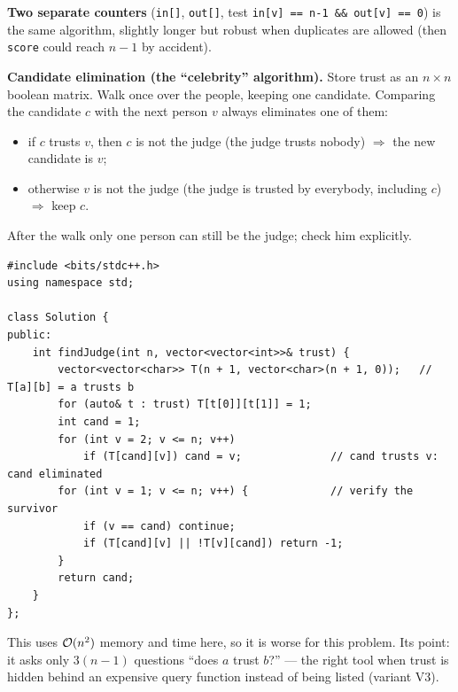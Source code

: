 \begin{alternativebox}
\textbf{Two separate counters} (\texttt{in[]}, \texttt{out[]}, test \texttt{in[v] == n-1 \&\& out[v] == 0}) is the same algorithm, slightly longer but robust when duplicates are allowed (then \texttt{score} could reach $n-1$ by accident).

\textbf{Candidate elimination (the ``celebrity'' algorithm).} Store trust as an $n \times n$ boolean matrix. Walk once over the people, keeping one candidate. Comparing the candidate $c$ with the next person $v$ always eliminates one of them:
\begin{itemize}[leftmargin=*]
    \item if $c$ trusts $v$, then $c$ is not the judge (the judge trusts nobody) $\Rightarrow$ the new candidate is $v$;
    \item otherwise $v$ is not the judge (the judge is trusted by everybody, including $c$) $\Rightarrow$ keep $c$.
\end{itemize}
After the walk only one person can still be the judge; check him explicitly.
\begin{lstlisting}[style=cpp]
#include <bits/stdc++.h>
using namespace std;

class Solution {
public:
    int findJudge(int n, vector<vector<int>>& trust) {
        vector<vector<char>> T(n + 1, vector<char>(n + 1, 0));   // T[a][b] = a trusts b
        for (auto& t : trust) T[t[0]][t[1]] = 1;
        int cand = 1;
        for (int v = 2; v <= n; v++)
            if (T[cand][v]) cand = v;              // cand trusts v: cand eliminated
        for (int v = 1; v <= n; v++) {             // verify the survivor
            if (v == cand) continue;
            if (T[cand][v] || !T[v][cand]) return -1;
        }
        return cand;
    }
};
\end{lstlisting}
This uses $\mathcal{O}(n^2)$ memory and time here, so it is worse for this problem. Its point: it asks only $3(n-1)$ questions ``does $a$ trust $b$?'' --- the right tool when trust is hidden behind an expensive query function instead of being listed (variant V3).

\begin{diagrambox}
\end{diagrambox}
\end{alternativebox}

